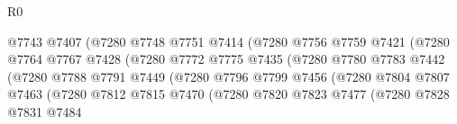 \begin{lexlean}{R0}
\begin{coremodule}
                                        @7743
                                        @7407
                                        (@7280
                                          @7748
                                          @7751
                                          @7414
                                          (@7280
                                            @7756
                                            @7759
                                            @7421
                                            (@7280
                                              @7764
                                              @7767
                                              @7428
                                              (@7280
                                                @7772
                                                @7775
                                                @7435
                                                (@7280
                                                  @7780
                                                  @7783
                                                  @7442
                                                  (@7280
                                                    @7788
                                                    @7791
                                                    @7449
                                                    (@7280
                                                      @7796
                                                      @7799
                                                      @7456
                                                      (@7280
                                                        @7804
                                                        @7807
                                                        @7463
                                                        (@7280
                                                          @7812
                                                          @7815
                                                          @7470
                                                          (@7280
                                                            @7820
                                                            @7823
                                                            @7477
                                                            (@7280
                                                              @7828
                                                              @7831
                                                              @7484

\end{coremodule}
\end{lexlean}
